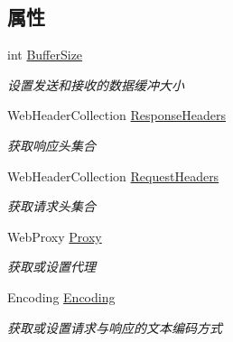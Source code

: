\subsection*{属性}
\begin{DoxyCompactItemize}
\item 
int \hyperlink{class_x_c_l_net_tools_1_1_file_handler_1_1_web_client_a192f27c95b8274758ca9d68c620de7c3}{Buffer\-Size}
\begin{DoxyCompactList}\small\item\em 设置发送和接收的数据缓冲大小 \end{DoxyCompactList}\item 
Web\-Header\-Collection \hyperlink{class_x_c_l_net_tools_1_1_file_handler_1_1_web_client_a3d00d3457c23ce30274af963f4cab6bb}{Response\-Headers}
\begin{DoxyCompactList}\small\item\em 获取响应头集合 \end{DoxyCompactList}\item 
Web\-Header\-Collection \hyperlink{class_x_c_l_net_tools_1_1_file_handler_1_1_web_client_a89d4bf2af70a2a0991904b1b61c8dd1d}{Request\-Headers}
\begin{DoxyCompactList}\small\item\em 获取请求头集合 \end{DoxyCompactList}\item 
Web\-Proxy \hyperlink{class_x_c_l_net_tools_1_1_file_handler_1_1_web_client_ac2f17eefdc2372eb01a6be915d19c0ba}{Proxy}
\begin{DoxyCompactList}\small\item\em 获取或设置代理 \end{DoxyCompactList}\item 
Encoding \hyperlink{class_x_c_l_net_tools_1_1_file_handler_1_1_web_client_a9bd02ab7f0198d34a44487c5d8c02f19}{Encoding}
\begin{DoxyCompactList}\small\item\em 获取或设置请求与响应的文本编码方式 \end{DoxyCompactList}\item 

\end{DoxyCompactItemize}
